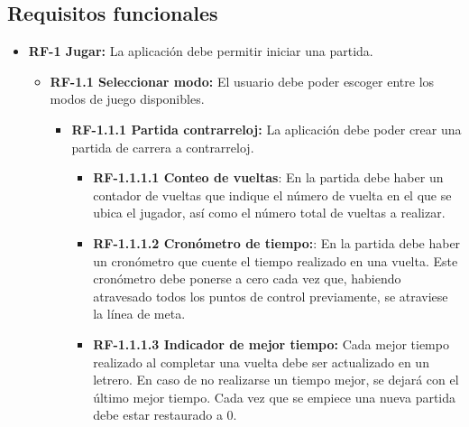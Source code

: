 \subsection{Requisitos funcionales}
\begin{itemize}
\tightlist
\item 
	\textbf{RF-1 Jugar:} La aplicación debe permitir iniciar una partida.
	
	\begin{itemize}
    \tightlist
    \item
      	\textbf{RF-1.1 Seleccionar modo:} El usuario debe poder escoger entre los modos de juego disponibles.
      	
      	\begin{itemize}
		\tightlist
		\item
			\textbf{RF-1.1.1 Partida contrarreloj:} La aplicación debe poder crear una partida de carrera a contrarreloj.			
			\begin{itemize}
			\tightlist
				\item \textbf{RF-1.1.1.1 Conteo de vueltas}: En la partida debe haber un contador de vueltas que indique el número de vuelta en el que se ubica el jugador, así como el número total de vueltas a realizar.
				\item \textbf{RF-1.1.1.2 Cronómetro de tiempo:}: En la partida debe haber un cronómetro que cuente el tiempo realizado en una vuelta. Este cronómetro debe ponerse a cero cada vez que, habiendo atravesado todos los puntos de control previamente, se atraviese la línea de meta.
				\item \textbf{RF-1.1.1.3 Indicador de mejor tiempo:} Cada mejor tiempo realizado al completar una vuelta debe ser actualizado en un letrero. En caso de no realizarse un tiempo mejor, se dejará con el último mejor tiempo. Cada vez que se empiece una nueva partida debe estar restaurado a 0.
			\end{itemize}
    	

\end{itemize}
\end{itemize}
\end{itemize}

